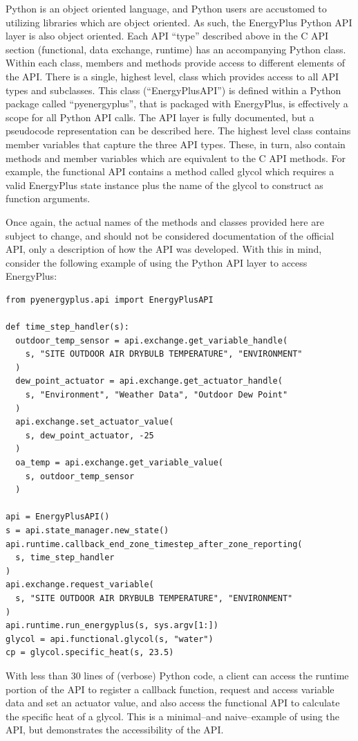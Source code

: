 \documentclass[5p, authoryear]{elsarticle}
\begin{document}
Python is an object oriented language, and Python users are accustomed to utilizing libraries which are object oriented.  As such, the EnergyPlus Python API layer is also object oriented.  Each API “type” described above in the C API section (functional, data exchange, runtime) has an accompanying Python class.  Within each class, members and methods provide access to different elements of the API.  There is a single, highest level, class which provides access to all API types and subclasses.  This class (“EnergyPlusAPI”) is defined within a Python package called “pyenergyplus”, that is packaged with EnergyPlus, is effectively a scope for all Python API calls.  The API layer is fully documented, but a pseudocode representation can be described here.  The highest level class contains member variables that capture the three API types.  These, in turn, also contain methods and member variables which are equivalent to the C API methods.  For example, the functional API contains a method called glycol which requires a valid EnergyPlus state instance plus the name of the glycol to construct as function arguments.

Once again, the actual names of the methods and classes provided here are subject to change, and should not be considered documentation of the official API, only a description of how the API was developed.  With this in mind, consider the following example of using the Python API layer to access EnergyPlus:

\lstset{language=python}
\begin{lstlisting}
from pyenergyplus.api import EnergyPlusAPI

def time_step_handler(s):
  outdoor_temp_sensor = api.exchange.get_variable_handle(
    s, "SITE OUTDOOR AIR DRYBULB TEMPERATURE", "ENVIRONMENT"
  )
  dew_point_actuator = api.exchange.get_actuator_handle(
    s, "Environment", "Weather Data", "Outdoor Dew Point"
  )
  api.exchange.set_actuator_value(
    s, dew_point_actuator, -25
  )
  oa_temp = api.exchange.get_variable_value(
    s, outdoor_temp_sensor
  )

api = EnergyPlusAPI()
s = api.state_manager.new_state()
api.runtime.callback_end_zone_timestep_after_zone_reporting(
  s, time_step_handler
)
api.exchange.request_variable(
  s, "SITE OUTDOOR AIR DRYBULB TEMPERATURE", "ENVIRONMENT"
)
api.runtime.run_energyplus(s, sys.argv[1:])
glycol = api.functional.glycol(s, "water")
cp = glycol.specific_heat(s, 23.5)
\end{lstlisting}

With less than 30 lines of (verbose) Python code, a client can access the runtime portion of the API to register a callback function, request and access variable data and set an actuator value, and also access the functional API to calculate the specific heat of a glycol.  This is a minimal--and naive--example of using the API, but demonstrates the accessibility of the API.
\end{document}
